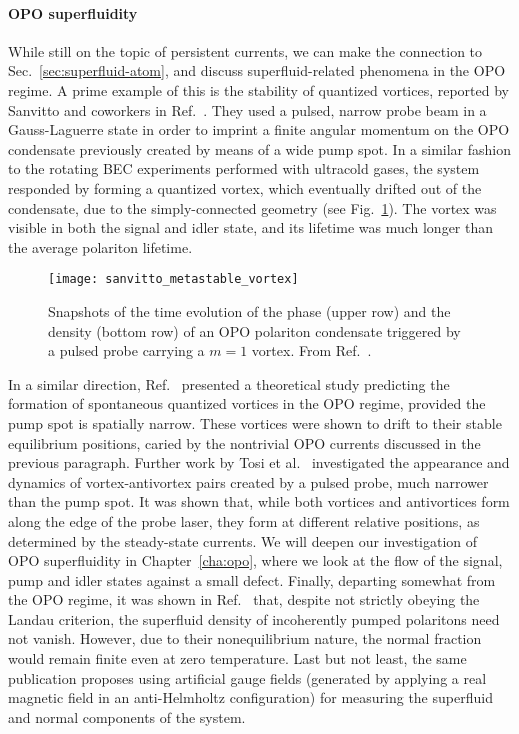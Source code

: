 \paragraph{OPO superfluidity}
While still on the topic of persistent currents, we can make the
connection to Sec.~\ref{sec:superfluid-atom}, and discuss
superfluid-related phenomena in the OPO regime. A prime example of
this is the stability of quantized vortices, reported by Sanvitto and
coworkers in Ref.~\cite{Sanvitto_2010}. They used a pulsed, narrow
probe beam in a Gauss-Laguerre state in order to imprint a finite
angular momentum on the OPO condensate previously created by means of
a wide pump spot. In a similar fashion to the rotating BEC experiments
performed with ultracold gases, the system responded by forming a
quantized vortex, which eventually drifted out of the condensate, due
to the simply-connected geometry (see
Fig.~\ref{fig:opo-metastable-vortex}). The vortex was visible in both
the signal and idler state, and its lifetime was much longer than the
average polariton lifetime.
%
\begin{figure}[tb]\centering
  \texttt{[image: sanvitto\_metastable\_vortex]}
  \caption{
    Snapshots of the time evolution of the phase (upper row) and the
    density (bottom row) of an OPO polariton condensate triggered by a
    pulsed probe carrying a $m=1$ vortex. From Ref.~\cite{Sanvitto_2010}.
  }\label{fig:opo-metastable-vortex}
\end{figure}
% 
In a similar direction,
Ref.~\cite{Marchetti_2010} presented a theoretical study predicting
the formation of spontaneous quantized vortices in the OPO regime,
provided the pump spot is spatially narrow. These vortices were shown
to drift to their stable equilibrium positions, caried by the
nontrivial OPO currents discussed in the previous paragraph. Further
work by Tosi et al.~\cite{Tosi_2011} investigated the appearance and
dynamics of vortex-antivortex pairs created by a pulsed probe, much
narrower than the pump spot. It was shown that, while both vortices
and antivortices form along the edge of the probe laser, they form at
different relative positions, as determined by the steady-state
currents. We will deepen our investigation of OPO superfluidity in
Chapter~\ref{cha:opo}, where we look at the flow of the signal, pump
and idler states against a small defect.
%
Finally, departing somewhat from the OPO regime, it was
shown in Ref.~\cite{Keeling_2011_prl} that, despite not strictly
obeying the Landau criterion, the superfluid density of incoherently
pumped polaritons need not vanish. However, due to their
nonequilibrium nature, the normal fraction would remain finite even at
zero temperature. Last but not least, the same publication proposes
using artificial gauge fields (generated by applying a real magnetic
field in an anti-Helmholtz configuration) for measuring the superfluid
and normal components of the system.


